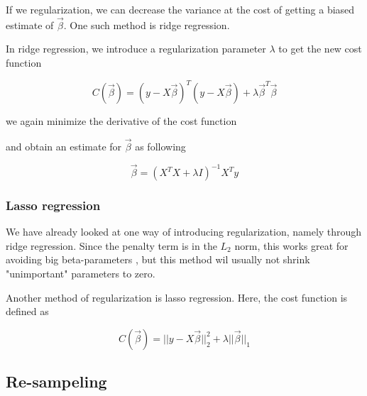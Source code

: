 \documentclass[12pt]{article}
\newcommand{\bbeta}{\vec{\beta}}
\newcommand{\hes}{X^TX}
\begin{document}
If we regularization, we can decrease the variance at the cost of getting a biased estimate of $\bbeta$.
One such method is ridge regression.

In ridge regression, we introduce a regularization parameter $\lambda$ to get the new cost function

\begin{equation}\label{eq:ridge_cost}
    C(\bbeta)=(y-X\bbeta)^T(y-X\bbeta) + \lambda \bbeta^T\bbeta
\end{equation}

we again minimize the derivative of the cost function


and obtain an estimate for $\bbeta$ as following

\begin{equation}\label{ridge}
    \bbeta=(\hes + \lambda I)^{-1} X^T y
\end{equation}


\subsubsection{Lasso regression}

We have already looked at one way of introducing regularization, namely through ridge regression.
Since the penalty term is in the $L_2$ norm, this works great for avoiding big beta-parameters %
, but this method wil usually not shrink "unimportant" parameters to zero.

Another method of regularization is lasso regression. Here, the cost function is defined as

\begin{equation}\label{eq:lasso_cost}
    C(\bbeta)=||y-X\bbeta||_2^2+\lambda ||\bbeta||_1
\end{equation}



\subsection{Re-sampeling}
\end{document}
